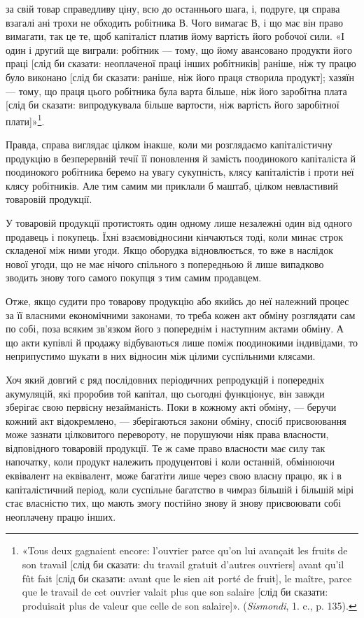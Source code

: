 \parcont{}  %
за свій товар справедливу ціну, всю до останнього шага, і, подруге,
ця справа взагалі ані трохи не обходить робітника $В$. Чого вимагає
$В$, і що має він право вимагати, так це те, щоб капіталіст
платив йому вартість його робочої сили. «І один і другий ще
виграли: робітник — тому, що йому авансовано продукти його
праці [слід би сказати: неоплаченої праці інших робітників]
раніше, ніж ту працю було виконано [слід би сказати: раніше,
ніж його праця створила продукт]; хазяїн — тому, що праця
цього робітника була варта більше, ніж його заробітна плата
[слід би сказати: випродукувала більше вартости, ніж вартість
його заробітної плати]»\footnote*{
«Tous deux gagnaient encore: l'ouvrier parce qu’on lui avançait les
fruits de son travail [слід би сказати: du travail gratuit d’autres ouvriers]
avant qu’il fût fait [слід би сказати: avant que le sien ait porté de fruit],
le maître, parce que le travail de cet ouvrier valait plus que son salaire
[слід би сказати: produisait plus de valeur que celle de son salaire]».
(\emph{Sismondi}, 1. c., p. 135).
}.
\enablefootnotebreak{}

Правда, справа виглядає цілком інакше, коли ми розглядаємо
капіталістичну продукцію в безперервній течії її поновлення
й замість поодинокого капіталіста й поодинокого робітника
беремо на увагу сукупність, клясу капіталістів і проти
неї клясу робітників. Але тим самим ми приклали б маштаб,
цілком невластивий товаровій продукції.

У товаровій продукції протистоять один одному лише незалежні
один від одного продавець і покупець. Їхні взаємовідносини
кінчаються тоді, коли минає строк складеної між ними угоди.
Якщо оборудка відновлюється, то вже в наслідок нової угоди,
що не має нічого спільного з попередньою й лише випадково
зводить знову того самого покупця з тим самим продавцем.

Отже, якщо судити про товарову продукцію або якийсь до
неї належний процес за її власними економічними законами,
то треба кожен акт обміну розглядати сам по собі, поза всяким
зв’язком його з попереднім і наступним актами обміну. А що акти
купівлі й продажу відбуваються лише поміж поодинокими індивідами,
то неприпустимо шукати в них відносин між цілими
суспільними клясами.

Хоч який довгий є ряд послідовних періодичних репродукцій
і попередніх акумуляцій, які проробив той капітал, що сьогодні
функціонує, він завжди зберігає свою первісну незайманість.
Поки в кожному акті обміну, — беручи кожний акт відокремлено, —
зберігаються закони обміну, спосіб присвоювання може зазнати
цілковитого перевороту, не порушуючи ніяк права власности,
відповідного товаровій продукції. Те ж саме право власности
має силу так напочатку, коли продукт належить продуцентові
і коли останній, обмінюючи еквівалент на еквівалент, може багатіти
лише через свою власну працю, як і в капіталістичний період,
коли суспільне багатство в чимраз більшій і більшій мірі
стає власністю тих, що мають змогу постійно знову й знову присвоювати
собі неоплачену працю інших.
